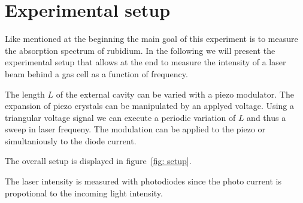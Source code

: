 \section{Experimental setup}
Like mentioned at the beginning the main goal of this experiment is to measure the absorption spectrum of rubidium.
In the following we will present the experimental setup that allows at the end to measure the intensity of a laser beam
behind a gas cell as a function of frequency.

The length $L$ of the external cavity can be varied with a piezo modulator. The expansion of piezo crystals can be manipulated by an
applyed voltage. Using a triangular voltage signal we can execute a periodic variation of $L$ and thus a sweep in laser frequeny. The
modulation can be applied to the piezo or simultaniously to the diode current.

The overall setup is displayed in figure~\ref{fig: setup}.


The laser intensity is measured with photodiodes since the photo current
is propotional to the incoming light intensity.
